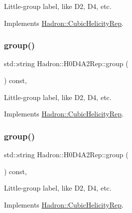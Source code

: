 Little-\/group label, like D2, D4, etc. 

Implements \mbox{\hyperlink{structHadron_1_1CubicHelicityRep_a101a7d76cd8ccdad0f272db44b766113}{Hadron\+::\+Cubic\+Helicity\+Rep}}.

\mbox{\label{structHadron_1_1H0D4A2Rep_a9bffbf0884c199fda3b8b85c4f43e333}} 
\subsubsection{\texorpdfstring{group()}{group()}\hspace{0.1cm}{\footnotesize\ttfamily [3/5]}}
{\footnotesize\ttfamily std\+::string Hadron\+::\+H0\+D4\+A2\+Rep\+::group (\begin{DoxyParamCaption}{ }\end{DoxyParamCaption}) const\hspace{0.3cm}{\ttfamily [inline]}, {\ttfamily [virtual]}}

Little-\/group label, like D2, D4, etc. 

Implements \mbox{\hyperlink{structHadron_1_1CubicHelicityRep_a101a7d76cd8ccdad0f272db44b766113}{Hadron\+::\+Cubic\+Helicity\+Rep}}.

\mbox{\label{structHadron_1_1H0D4A2Rep_a9bffbf0884c199fda3b8b85c4f43e333}} 
\subsubsection{\texorpdfstring{group()}{group()}\hspace{0.1cm}{\footnotesize\ttfamily [4/5]}}
{\footnotesize\ttfamily std\+::string Hadron\+::\+H0\+D4\+A2\+Rep\+::group (\begin{DoxyParamCaption}{ }\end{DoxyParamCaption}) const\hspace{0.3cm}{\ttfamily [inline]}, {\ttfamily [virtual]}}

Little-\/group label, like D2, D4, etc. 

Implements \mbox{\hyperlink{structHadron_1_1CubicHelicityRep_a101a7d76cd8ccdad0f272db44b766113}{Hadron\+::\+Cubic\+Helicity\+Rep}}.

\mbox{\label{structHadron_1_1H0D4A2Rep_a9bffbf0884c199fda3b8b85c4f43e333}} 
